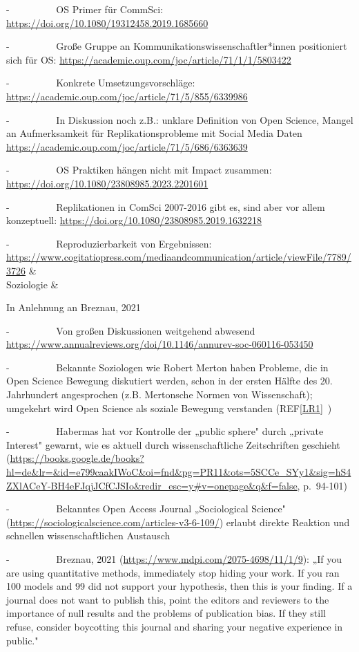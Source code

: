 \documentclass[
  letterpaper,
  DIV=11,
  numbers=noendperiod]{scrreprt}
\begin{document}
\begin{longtable}[]
-~~~~~~~~~ OS Primer für CommSci:
\url{https://doi.org/10.1080/19312458.2019.1685660}

-~~~~~~~~~ Große Gruppe an Kommunikationswissenschaftler*innen
positioniert sich für OS:
\url{https://academic.oup.com/joc/article/71/1/1/5803422}

-~~~~~~~~~ Konkrete Umsetzungsvorschläge:
\url{https://academic.oup.com/joc/article/71/5/855/6339986}

-~~~~~~~~~ In Diskussion noch z.B.: unklare Definition von Open Science,
Mangel an Aufmerksamkeit für Replikationsprobleme mit Social Media Daten
\url{https://academic.oup.com/joc/article/71/5/686/6363639}

-~~~~~~~~~ OS Praktiken hängen nicht mit Impact zusammen:
\url{https://doi.org/10.1080/23808985.2023.2201601}

-~~~~~~~~~ Replikationen in ComSci 2007-2016 gibt es, sind aber vor
allem konzeptuell: \url{https://doi.org/10.1080/23808985.2019.1632218}

-~~~~~~~~~ Reproduzierbarkeit von Ergebnissen:
\url{https://www.cogitatiopress.com/mediaandcommunication/article/viewFile/7789/3726}
& \\
Soziologie & \begin{minipage}[t]{\linewidth}\raggedright
In Anlehnung an Breznau, 2021

-~~~~~~~~~ Von großen Diskussionen weitgehend abwesend
\url{https://www.annualreviews.org/doi/10.1146/annurev-soc-060116-053450}

-~~~~~~~~~ Bekannte Soziologen wie Robert Merton haben Probleme, die in
Open Science Bewegung diskutiert werden, schon in der ersten Hälfte des
20. Jahrhundert angesprochen (z.B. Mertonsche Normen von Wissenschaft);
umgekehrt wird Open Science als soziale Bewegung verstanden
(REF\hyperref[_msocom_1]{{[}LR1{]}}~)

-~~~~~~~~~ Habermas hat vor Kontrolle der „public sphere" durch „private
Interest" gewarnt, wie es aktuell durch wissenschaftliche Zeitschriften
geschieht
(\url{https://books.google.de/books?hl=de&lr=&id=e799caakIWoC&oi=fnd&pg=PR11&ots=5SCCe_SYy1&sig=hS4ZXlACeY-BH4eFJqjJCfCJSIo&redir_esc=y\#v=onepage&q&f=false},
p.~94-101)

-~~~~~~~~~ Bekanntes Open Access Journal „Sociological Science"
(\url{https://sociologicalscience.com/articles-v3-6-109/}) erlaubt
direkte Reaktion und schnellen wissenschaftlichen Austausch

-~~~~~~~~~ Breznau, 2021 (\url{https://www.mdpi.com/2075-4698/11/1/9}):
„If you are using quantitative methods, immediately stop hiding your
work. If you ran 100 models and 99 did not support your hypothesis, then
this is your finding. If a journal does not want to publish this, point
the editors and reviewers to the importance of null results and the
problems of publication bias. If they still refuse, consider boycotting
this journal and sharing your negative experience in public."


\end{minipage}
\end{longtable}
\end{document}
